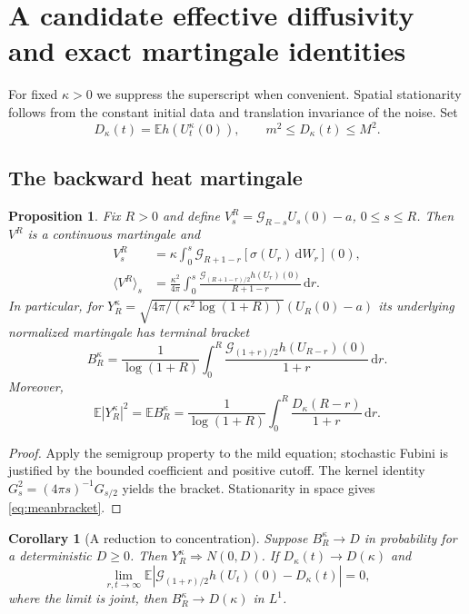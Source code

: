 \documentclass[11pt]{article}
\numberwithin{equation}{section}
\newtheorem{proposition}[theorem]{Proposition}
\newtheorem{corollary}[theorem]{Corollary}
\theoremstyle{definition}
\theoremstyle{remark}
\newcommand{\E}{\mathbb E}
\newcommand{\clG}{\mathcal G}
\newcommand{\dd}{\,\mathrm d}
\begin{document}
\section{A candidate effective diffusivity and exact martingale identities}
For fixed $\kappa>0$ we suppress the superscript when convenient. Spatial stationarity follows from the constant initial data and translation invariance of the noise. Set
\begin{equation}\label{eq:Dtime}
 D_\kappa(t)=\E h(U_t^\kappa(0)),\qquad m^2\le D_\kappa(t)\le M^2.
\end{equation}
\subsection{The backward heat martingale}
\begin{proposition}\label{prop:bracket}
Fix $R>0$ and define $V_s^R=\clG_{R-s}U_s(0)-a$, $0\le s\le R$. Then $V^R$ is a continuous martingale and
\begin{align}
 V_s^R&=\kappa\int_0^s\clG_{R+1-r}[\sigma(U_r)\dd W_r](0),\\
 \langle V^R\rangle_s&=\frac{\kappa^2}{4\pi}\int_0^s
 \frac{\clG_{(R+1-r)/2}h(U_r)(0)}{R+1-r}\dd r.\label{eq:bracket}
\end{align}
In particular, for $Y_R^\kappa=\sqrt{4\pi/(\kappa^2\log(1+R))}(U_R(0)-a)$ its underlying normalized martingale has terminal bracket
\begin{equation}\label{eq:bracket_B}
 B_R^\kappa=\frac1{\log(1+R)}\int_0^R\frac{\clG_{(1+r)/2}h(U_{R-r})(0)}{1+r}\dd r.
\end{equation}
Moreover,
\begin{equation}\label{eq:meanbracket}
 \E|Y_R^\kappa|^2=\E B_R^\kappa=\frac1{\log(1+R)}\int_0^R\frac{D_\kappa(R-r)}{1+r}\dd r.
\end{equation}
\end{proposition}
\begin{proof}
Apply the semigroup property to the mild equation; stochastic Fubini is justified by the bounded coefficient and positive cutoff. The kernel identity $G_s^2=(4\pi s)^{-1}G_{s/2}$ yields the bracket. Stationarity in space gives \eqref{eq:meanbracket}.
\end{proof}
\begin{corollary}[A reduction to concentration]\label{cor:CLT}
Suppose $B_R^\kappa\to D$ in probability for a deterministic $D\ge0$. Then $Y_R^\kappa\Rightarrow N(0,D)$. If $D_\kappa(t)\to D(\kappa)$ and
\begin{equation}\label{eq:spatial_concentration}
 \lim_{r,t\to\infty}\E\left|\clG_{(1+r)/2}h(U_t)(0)-D_\kappa(t)\right|=0,
\end{equation}
where the limit is joint, then $B_R^\kappa\to D(\kappa)$ in $L^1$.
\end{corollary}
\end{document}
